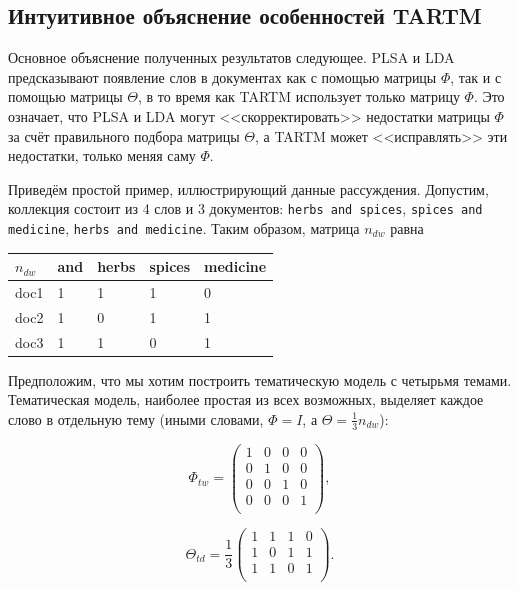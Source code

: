 \subsection{Интуитивное объяснение особенностей TARTM}

Основное объяснение полученных результатов следующее. PLSA и LDA предсказывают появление слов в документах как с помощью матрицы $\Phi$, так и с помощью матрицы $\Theta$, в то время как TARTM использует только матрицу $\Phi$. Это означает, что PLSA и LDA могут <<скорректировать>> недостатки матрицы $\Phi$ за счёт правильного подбора матрицы $\Theta$, а TARTM может <<исправлять>> эти недостатки, только меняя саму $\Phi$.

Приведём простой пример, иллюстрирующий данные рассуждения. Допустим, коллекция состоит из 4 слов и 3 документов: \texttt{herbs and spices}, \texttt{spices and medicine}, \texttt{herbs and medicine}. Таким образом, матрица $n_{dw}$ равна

\begin{center}
\begin{tabular}{l|llll}
$n_{dw}$   & and & herbs & spices & medicine \\ \hline
doc1       & 1   & 1     & 1      & 0        \\
doc2       & 1   & 0     & 1      & 1        \\
doc3       & 1   & 1     & 0      & 1      
\end{tabular}
\end{center}

Предположим, что мы хотим построить тематическую модель с четырьмя темами. Тематическая модель, наиболее простая из всех возможных, выделяет каждое слово в отдельную тему (иными словами, $\Phi = I$, а $\Theta = \frac{1}{3} n_{dw}$):

\begin{minipage}[t]{0.25\textwidth}
\[
\Phi_{tw} =
\begin{pmatrix}
    1 & 0 & 0 & 0 \\
    0 & 1 & 0 & 0 \\
    0 & 0 & 1 & 0 \\
    0 & 0 & 0 & 1 \\
\end{pmatrix},
\]

\end{minipage}\begin{minipage}[t]{0.2\textwidth}

\[
\Theta_{td} = \frac{1}{3}
\begin{pmatrix}
    1 & 1 & 1 & 0 \\
    1 & 0 & 1 & 1 \\
    1 & 1 & 0 & 1 \\
\end{pmatrix}.
\]

\end{minipage}

